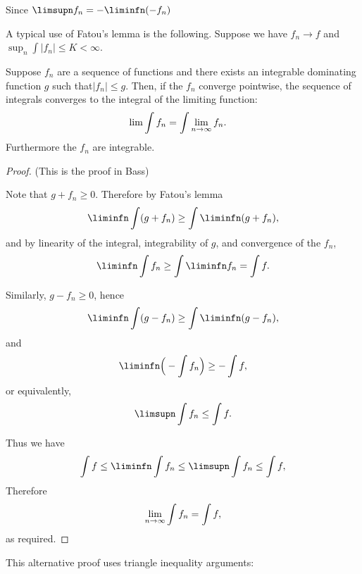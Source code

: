 Since $\limsupn f_n = -\liminfn (-f_n)$

A typical use of Fatou’s lemma is the following. Suppose we have $f_n \to f$ and $\sup_n \int |f_n| \leq K < \infty$.


\begin{theorem*}
  Suppose $f_n$ are a sequence of functions and there exists an integrable dominating function $g$ such
  that$|f_n| \leq g$. Then, if the $f_n$ converge pointwise, the sequence of integrals converges to the
  integral of the limiting function:
  \begin{align*}
    \lim \int f_n &= \int \limn f_n.
  \end{align*}
  Furthermore the $f_n$ are integrable.
\end{theorem*}

\begin{proof}

  (This is the proof in Bass)

  Note that $g + f_n \geq 0$. Therefore by Fatou's lemma
  \begin{align*}
    \liminfn \int (g + f_n) \geq \int \liminfn (g + f_n),
  \end{align*}
  and by linearity of the integral, integrability of $g$, and convergence of the $f_n$,
  \begin{align*}
    \liminfn \int f_n
    \geq \int \liminfn f_n
    = \int f.
  \end{align*}

  Similarly, $g - f_n \geq 0$, hence
  \begin{align*}
    \liminfn \int (g - f_n) \geq \int \liminfn (g - f_n),
  \end{align*}
  and
  \begin{align*}
    \liminfn \Big(-\int f_n\Big) \geq -\int f,
  \end{align*}
  or equivalently,
  \begin{align*}
    \limsupn \int f_n \leq \int f.
  \end{align*}

  Thus we have
  \begin{align*}
    \int f \leq \liminfn \int f_n \leq \limsupn \int f_n \leq \int f,
  \end{align*}
  Therefore
  \begin{align*}
    \limn \int f_n = \int f,
  \end{align*}
  as required.
\end{proof}


This alternative proof uses triangle inequality arguments:

